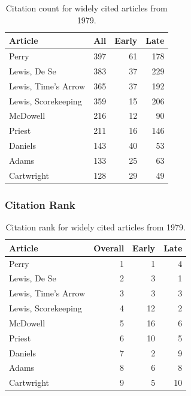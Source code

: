 \documentclass[
  10pt,
  letterpaper,
  DIV=11,
  numbers=noendperiod,
  twoside]{scrartcl}
\begin{document}
\begin{longtable}[]{@{}lrrr@{}}

\caption{\label{tbl-citation-count-1979}Citation count for widely cited
articles from 1979.}

\tabularnewline

\toprule\noalign{}
Article & All & Early & Late \\
\midrule\noalign{}
\endhead
\bottomrule\noalign{}
\endlastfoot
Perry & 397 & 61 & 178 \\
Lewis, De Se & 383 & 37 & 229 \\
Lewis, Time's Arrow & 365 & 37 & 192 \\
Lewis, Scorekeeping & 359 & 15 & 206 \\
McDowell & 216 & 12 & 90 \\
Priest & 211 & 16 & 146 \\
Daniels & 143 & 40 & 53 \\
Adams & 133 & 25 & 63 \\
Cartwright & 128 & 29 & 49 \\

\end{longtable}

\subsubsection*{Citation Rank}\label{sec-rank-1979}

\begin{longtable}[]{@{}lrrr@{}}

\caption{\label{tbl-citation-rank-1979}Citation rank for widely cited
articles from 1979.}

\tabularnewline

\toprule\noalign{}
Article & Overall & Early & Late \\
\midrule\noalign{}
\endhead
\bottomrule\noalign{}
\endlastfoot
Perry & 1 & 1 & 4 \\
Lewis, De Se & 2 & 3 & 1 \\
Lewis, Time's Arrow & 3 & 3 & 3 \\
Lewis, Scorekeeping & 4 & 12 & 2 \\
McDowell & 5 & 16 & 6 \\
Priest & 6 & 10 & 5 \\
Daniels & 7 & 2 & 9 \\
Adams & 8 & 6 & 8 \\
Cartwright & 9 & 5 & 10 \\

\end{longtable}
\end{document}
